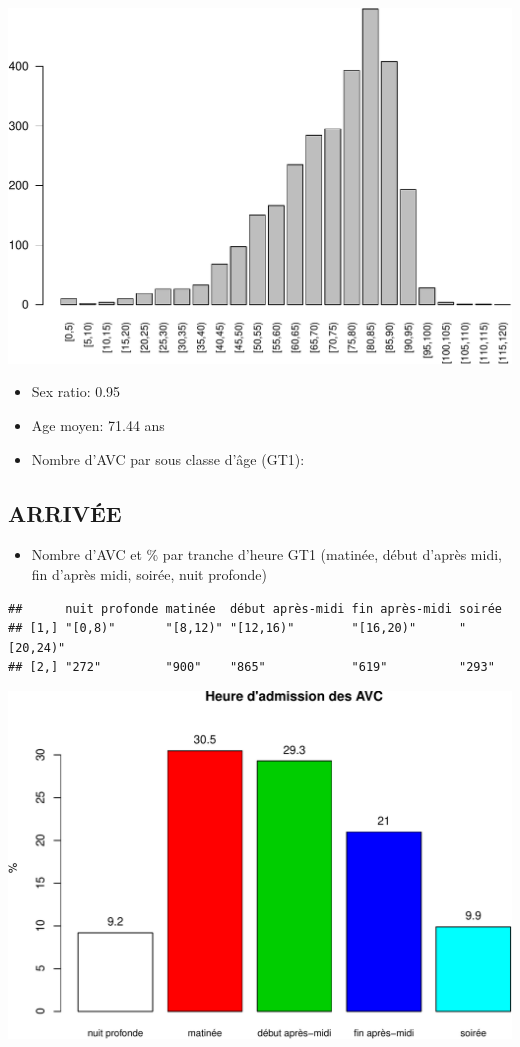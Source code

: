 \documentclass[]{article}
\begin{document}
\includegraphics{rapport2014_V4_files/figure-latex/patients-1.pdf}

\begin{itemize}
\itemsep1pt\parskip0pt
\item
  Sex ratio: 0.95
\item
  Age moyen: 71.44 ans
\item
  Nombre d'AVC par sous classe d'âge (GT1):
\end{itemize}

\subsection{ARRIVÉE}\label{arrivee-2}

\begin{itemize}
\itemsep1pt\parskip0pt
\item
  Nombre d'AVC et \% par tranche d'heure GT1 (matinée, début d'après
  midi, fin d'après midi, soirée, nuit profonde)
\end{itemize}

\begin{verbatim}
##      nuit profonde matinée  début après-midi fin après-midi soirée   
## [1,] "[0,8)"       "[8,12)" "[12,16)"        "[16,20)"      "[20,24)"
## [2,] "272"         "900"    "865"            "619"          "293"
\end{verbatim}

\includegraphics{rapport2014_V4_files/figure-latex/avc_periode-1.pdf}
\end{document}
